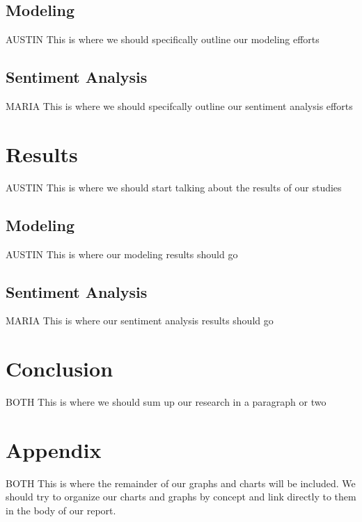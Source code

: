 \documentclass[11pt,english]{article}
\begin{document}
\subsection{Modeling}
    AUSTIN
    This is where we should specifically outline our modeling efforts

\subsection{Sentiment Analysis}
    MARIA
    This is where we should specifcally outline our sentiment analysis efforts

\section{Results}
    AUSTIN
    This is where we should start talking about the results of our studies

\subsection{Modeling}
    AUSTIN
    This is where our modeling results should go

\subsection{Sentiment Analysis}
    MARIA
    This is where our sentiment analysis results should go

\section{Conclusion}
    BOTH
    This is where we should sum up our research in a paragraph or two

\newpage
\section{Appendix}
    BOTH
    This is where the remainder of our graphs and charts will be included. We should try to organize our charts and graphs by concept and link directly to them in the body of our report.
\end{document}
